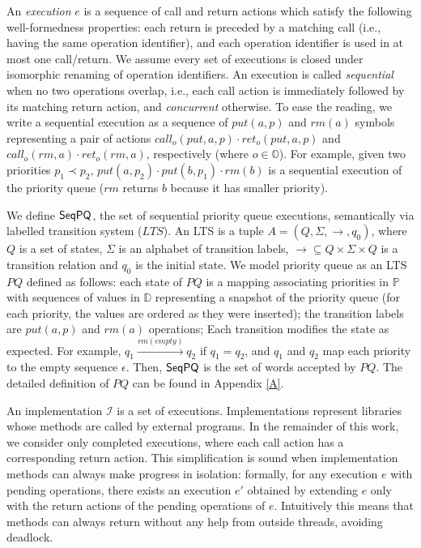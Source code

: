 An \emph{execution} $e$ is a sequence of call and return actions which satisfy the following well-formedness properties: each return is preceded by a matching call (i.e., having the same operation identifier), and each operation identifier is used in at most one call/return. We assume every set of executions is closed under isomorphic renaming of operation identifiers. An execution is called \emph{sequential} when no two operations overlap, i.e., each call action is immediately followed by its matching return action, and \emph{concurrent} otherwise. To ease the reading, we write a sequential execution as a sequence of $\textit{put}(a,p)$ and $\textit{rm}(a)$ symbols representing a pair of actions $\textit{call}_o(\textit{put},a,p)\cdot \textit{ret}_o(\textit{put},a,p)$ and $\textit{call}_o(\textit{rm},a)\cdot \textit{ret}_o(\textit{rm},a)$, respectively (where $o\in\mathbb{O}$). For example, given two priorities $p_1 \prec p_2$, $\textit{put}(a,p_2) \cdot \textit{put}(b,p_1) \cdot \textit{rm}(b)$ is a sequential execution of the priority queue ($\textit{rm}$ returns $b$ because it has smaller priority).

We define $\mathsf{SeqPQ}$, the set of sequential priority queue executions, semantically via labelled transition system ($LTS$). An LTS is a tuple $A=(Q,\Sigma,\rightarrow,q_0)$, where $Q$ is a set of states, $\Sigma$ is an alphabet of transition labels, $\rightarrow\subseteq Q\times\Sigma\times Q$ is a transition relation and $q_0$ is the initial state. We model priority queue as an LTS $\textit{PQ}$ defined as follows: each state of $\textit{PQ}$ is a mapping associating priorities in $\mathbb{P}$ with sequences of values in $\mathbb{D}$ representing a snapshot of the priority queue (for each priority, the values are ordered as they were inserted); the transition labels are $\textit{put}(a,p)$ and $\textit{rm}(a)$ operations; Each transition modifies the state as expected. For example, $q_1 \xrightarrow{\textit{rm}(\textit{empty})} q_2$ if $q_1 = q_2$, and $q_1$ and $q_2$ map each priority to the empty sequence $\epsilon$. Then, $\mathsf{SeqPQ}$ is the set of words accepted by $\textit{PQ}$. The detailed definition of $\textit{PQ}$ can be found in Appendix \ref{A}. 


An implementation $\mathcal{I}$ is a set of executions. Implementations represent libraries whose methods are called by external programs. In the remainder of this work, we consider only completed executions, where each call action has a corresponding return action. This simplification is sound when implementation methods can always make progress in isolation: formally, for any execution $e$ with pending operations, there exists an execution $e'$ obtained by extending $e$ only with the return actions of the pending operations of $e$. Intuitively this means that methods can always return without any help from outside threads, avoiding deadlock.


